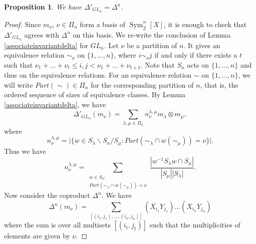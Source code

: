 \documentclass[10pt,a4paper]{amsart}
\newtheorem{proposition}{Proposition}
\DeclareMathOperator{\Sym}{Sym}
\begin{document}
\begin{proposition}\label{coproduct agrees with coproduct}
We have
$
\Delta'_{GL_{n}}=\Delta^n.
$
\end{proposition}

\begin{proof}
Since $m_{\nu}$, $\nu\in\Pi_{n}$ form a basis of $\Sym_{\mathbb{Z}}^{n}[X]$, it is enough to check that $\Delta'_{GL_{n}}$ agrees with $\Delta^{n}$ on this basis.
We re-write the conclusion of Lemma \ref{associateinvariantdelta} for $GL_n$. Let $\nu$ be a partition of $n$. It gives an equivalence relation $\sim_\nu$ on $\{1,\ldots,n\}$, where $i\sim_\nu j$ if and only if there exists a $t$ such that $\nu_1+\ldots+\nu_t\leq i,j<\nu_1+\ldots+\nu_{t+1}$. Note that $S_n$ acts on $\{1,\ldots,n\}$ and thus on the equivalence relations. For an equivalence relation $\sim$ on $\{1,\ldots,n\}$, we will write $Part(\sim)\in\Pi_n$ for the corresponding partition of $n$, that is, the ordered sequence of sizes of equivalence classes. 
By Lemma \ref{associateinvariantdelta}, we have
\[
    \Delta'_{GL_{n}}(m_\nu)=\sum_{\lambda,\mu\in\Pi_{n}}n_{\nu}^{\lambda,\mu}m_\lambda\otimes m_\mu,
\]
where 
\[
n_{\nu}^{\lambda,\mu}=\big|\{w\in S_{\lambda}\backslash S_{n}/S_{\mu}:Part(\sim_{\lambda}\cap w(\sim_{\mu}))=\nu\}\big|.
\]
Thus we have
\begin{equation}\label{eq:GLn}
  n_\nu^{\lambda,\mu}
  =
  \sum_{\substack{w\in S_n\colon
  \\
  Part(\sim_\lambda\cap w(\sim_\mu))=\nu}}\frac{|w^{-1}S_{\lambda}w\cap S_{\mu}|}{|S_\mu||S_\lambda|}.
\end{equation}
Now consider the coproduct $\Delta^n$.
We have
\[
    \Delta^{n}(m_\nu)=\sum_{[(i_1,j_1),\ldots,(i_n,j_n)]}(X_{i_1}Y_{j_1})\ldots(X_{i_n}Y_{j_n})
\]
where the sum is over all multisets $[(i_t,j_t)]$ such that the multiplicities of elements are given by $\nu$.


\end{proof}
\end{document}
